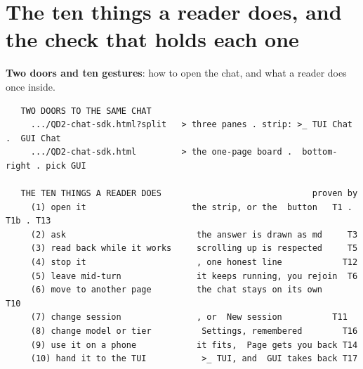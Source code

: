 \section{The ten things a reader does, and the check that holds each one}
\textbf{Two doors and ten gestures}: how to open the chat, and what a reader does once inside.

\begin{verbatim}
   TWO DOORS TO THE SAME CHAT
     .../QD2-chat-sdk.html?split   > three panes . strip: >_ TUI Chat .  GUI Chat
     .../QD2-chat-sdk.html         > the one-page board .  bottom-right . pick GUI

   THE TEN THINGS A READER DOES                              proven by
     (1) open it                     the strip, or the  button   T1 . T1b . T13
     (2) ask                          the answer is drawn as md     T3
     (3) read back while it works     scrolling up is respected     T5
     (4) stop it                      , one honest line            T12
     (5) leave mid-turn               it keeps running, you rejoin  T6
     (6) move to another page         the chat stays on its own     T10
     (7) change session               , or  New session          T11
     (8) change model or tier          Settings, remembered        T16
     (9) use it on a phone            it fits,  Page gets you back T14
     (10) hand it to the TUI           >_ TUI, and  GUI takes back T17
\end{verbatim}

